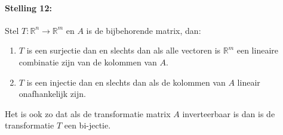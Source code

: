 \paragraph{Stelling 12:}  Stel $T: \mathbb{R}^n \to \mathbb{R}^m$ en $A$ is de bijbehorende matrix, dan:
\begin{enumerate}
	\item $T$ is een surjectie dan en slechts dan als alle vectoren is $\mathbb{R}^m$ een lineaire combinatie zijn van de kolommen van $A$.
	\item $T$ is een injectie dan en slechts dan als de kolommen van $A$ lineair onafhankelijk zijn.
\end{enumerate}

Het is ook zo dat als de transformatie matrix $A$ inverteerbaar is dan is de transformatie $T$ een bi-jectie.



